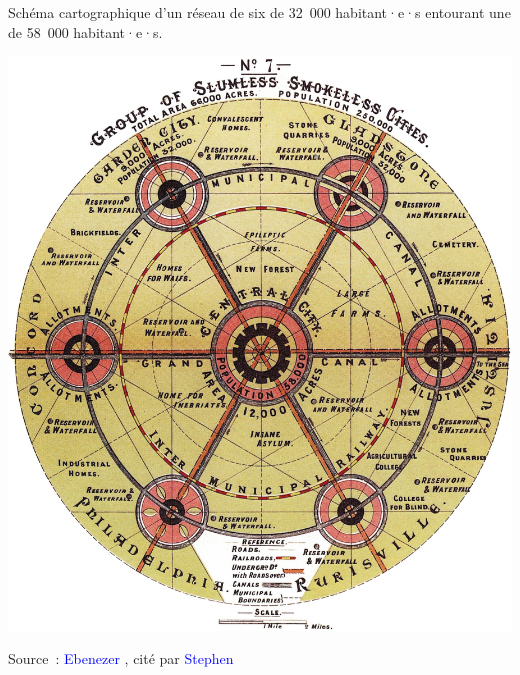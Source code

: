 \begin{refsegment}
    \begin{carte}[h!]\vspace*{4pt}
        \caption{Schéma cartographique d'un réseau de six  de 32~000 habitant·e·s entourant une  de 58~000 habitant·e·s.}
        \label{fig-chap1:schema-cite-jardin}
        \centerline{\includegraphics[width=0.75\columnwidth]{src/Figures/Chap-1/Cite_jardin.jpg}}
        \vspace{5pt}
        \begin{flushright}\scriptsize{
        Source~: \textcolor{blue}{Ebenezer} \textcolor{blue}{\textcite[90]{howard_-morrow_1898}}, cité par \textcolor{blue}{Stephen} \textcolor{blue}{\textcite[3]{ward_garden_1992}}
        }\end{flushright}
    \end{carte}


\end{refsegment}

